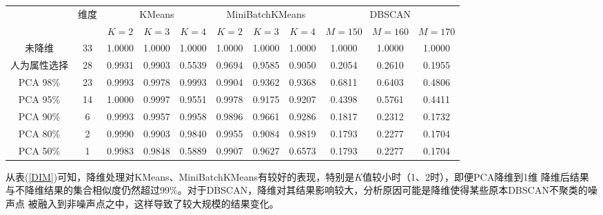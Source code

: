 \documentclass{acm_proc_article-sp}
\begin{document}
\begin{table*}[!ht]
\centering
\caption{降维对聚类算法影响评估}
\begin{tabular}{@{}c|c|ccc|ccc|ccc@{}}
\toprule
              &\multicolumn{1}{c|}{\multirow{2}{*}{维度}} & \multicolumn{3}{c|}{KMeans} & \multicolumn{3}{c|}{MiniBatchKMeans} & \multicolumn{3}{c}{DBSCAN} \\
              &\multicolumn{1}{c|}{}                     & $K=2$   & $K=3$   & $K=4$   & $K=2$      & $K=3$      & $K=4$      & $M=150$ & $M=160$ & $M=170$ \\ \midrule
未降维         & 33                                       & 1.0000  & 1.0000  & 1.0000  & 1.0000     & 1.0000     & 1.0000     & 1.0000  & 1.0000  & 1.0000  \\
人为属性选择    & 28                                       & 0.9931  & 0.9903  & 0.5539  & 0.9694     & 0.9585     & 0.9050     & 0.2054  & 0.2610  & 0.1955  \\
PCA 98\%      & 23                                       & 0.9993  & 0.9978  & 0.9993  & 0.9904     & 0.9362     & 0.9368     & 0.6811  & 0.6403  & 0.4806  \\
PCA 95\%      & 14                                       & 1.0000  & 0.9997  & 0.9551  & 0.9978     & 0.9175     & 0.9207     & 0.4398  & 0.5761  & 0.4411  \\
PCA 90\%      & 6                                        & 0.9993  & 0.9957  & 0.9958  & 0.9896     & 0.9661     & 0.9286     & 0.1817  & 0.2312  & 0.1732  \\ 
PCA 80\%      & 2                                        & 0.9990  & 0.9903  & 0.9840  & 0.9955     & 0.9084     & 0.9819     & 0.1793  & 0.2277  & 0.1704  \\ 
PCA 50\%      & 1                                        & 0.9983  & 0.9848  & 0.5889  & 0.9907     & 0.9627     & 0.6573     & 0.1793  & 0.2277  & 0.1704  \\ \bottomrule
\end{tabular}
\label{DIM}
\end{table*}

从表(\ref{DIM})可知，降维处理对KMeans、MiniBatchKMeans有较好的表现，特别是$K$值较小时（1、2时），即便PCA降维到1维
降维后结果与不降维结果的集合相似度仍然超过99\%。对于DBSCAN，降维对其结果影响较大，分析原因可能是降维使得某些原本DBSCAN不聚类的噪声点
被融入到非噪声点之中，这样导致了较大规模的结果变化。
\end{document}
